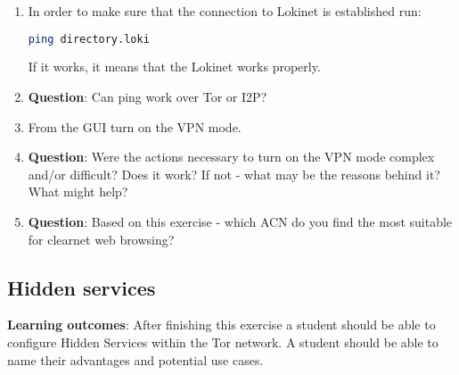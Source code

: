 \begin{enumerate}
    \item In order to make sure that the connection to Lokinet is established run:
    \begin{lstlisting}[language=bash]
    ping directory.loki
    \end{lstlisting}
    If it works, it means that the Lokinet works properly.
    \item \textbf{Question}: Can ping work over Tor or I2P?
    \item From the GUI turn on the VPN mode.
    \item \textbf{Question}: Were the actions necessary to turn on the VPN mode complex and/or difficult? Does it work? If not - what may be the reasons behind it? What might help?
    \item \textbf{Question}: Based on this exercise - which ACN do you find the most suitable for clearnet web browsing?
\end{enumerate}


\subsection{Hidden services}
\textbf{Learning outcomes}: After finishing this exercise a student should be able to configure Hidden Services within the Tor network. A student should be able to name their advantages and potential use cases.

